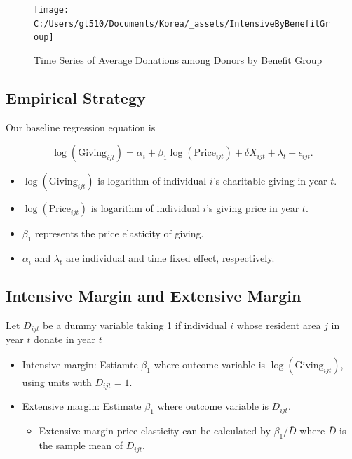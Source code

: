 \documentclass[ review  , 3p ]{elsarticle}
\providecommand{\tightlist}{%
  \setlength{\itemsep}{0pt}\setlength{\parskip}{0pt}}
\begin{document}
  \begin{figure}
  
  {\centering \texttt{[image: C:/Users/gt510/Documents/Korea/\_assets/IntensiveByBenefitGroup]} 
  
  }
  
  \caption{Time Series of Average Donations among Donors by Benefit Group}\label{fig:unnamed-chunk-5}
  \end{figure}
  
  \hypertarget{empirical-strategy}{%
  \subsection{Empirical Strategy}\label{empirical-strategy}}
  
  Our baseline regression equation is
  
  \[
      \log(\text{Giving}_{ijt}) = 
      \alpha_i + \beta_1 \log(\text{Price}_{ijt}) + \delta X_{ijt} + \lambda_t + \epsilon_{ijt}.
  \]
  
  \begin{itemize}
  \tightlist
  \item
    \(\log(\text{Giving}_{ijt})\) is logarithm of individual \(i\)'s charitable giving in year \(t\).
  \item
    \(\log(\text{Price}_{ijt})\) is logarithm of individual \(i\)'s giving price in year \(t\).
  \item
    \(\beta_1\) represents the price elasticity of giving.
  \item
    \(\alpha_i\) and \(\lambda_t\) are individual and time fixed effect, respectively.
  \end{itemize}
  
  \hypertarget{intensive-margin-and-extensive-margin}{%
  \subsection{Intensive Margin and Extensive Margin}\label{intensive-margin-and-extensive-margin}}
  
  Let \(D_{ijt}\) be a dummy variable taking 1 if individual \(i\) whose resident area \(j\) in year \(t\) donate in year \(t\)
  
  \begin{itemize}
  \tightlist
  \item
    Intensive margin: Estiamte \(\beta_1\) where outcome variable is \(\log(\text{Giving}_{ijt})\), using units with \(D_{ijt} = 1\).
  \item
    Extensive margin: Estimate \(\beta_1\) where outcome variable is \(D_{ijt}\).
  
    \begin{itemize}
    \tightlist
    \item
      Extensive-margin price elasticity can be calculated by \(\beta_1/\bar{D}\) where \(\bar{D}\) is the sample mean of \(D_{ijt}\).
    \end{itemize}
  \end{itemize}
  
\end{document}
